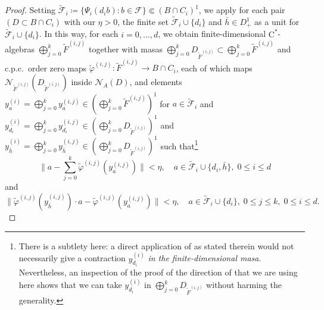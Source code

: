 \documentclass[11pt,a4paper]{amsart}
\theoremstyle{definition}
\numberwithin{equation}{section}
\newcommand{\mc}[1]{\mathcal{#1}}
\begin{document}
\begin{proof}
Setting $\tilde{\mathcal{F}}_i\coloneqq\{\Psi_i(d_ib):b\in \mc{F}\} \Subset (B\cap C_i)^1$, we apply \cite[Proposition~2.3]{LiLiaWin23} for each pair $(D\subset B\cap C_i)$ with our $\eta>0$, the finite set $\tilde{\mc{F}}_i\cup\{d_i\}$  and $\bar{h}\in D_+^1$ as a unit for $\tilde{\mc{F}}_i\cup\{d_i\}$. In this way, for each $i=0,\dots,d$, we obtain finite-dimensional $\mathrm{C}^\ast$-algebras $\bigoplus_{j=0}^k\tilde{F}^{(i,j)}$ together with masas $\bigoplus_{j=0}^kD_{\tilde{F}^{(i,j)}}\subset\bigoplus_{j=0}^k\tilde{F}^{(i,j)}$ and c.p.c.\ order zero maps $\tilde{\varphi}^{(i,j)}\colon\tilde{F}^{(i,j)}\to B\cap C_i$, each of which maps $\mc{N}_{\tilde{F}^{(i,j)}}(D_{\tilde{F}^{(i,j)}})$ inside $\mc{N}_A(D)$, and elements $y_a^{(i)}=\bigoplus_{j=0}^ky_a^{(i,j)}\in(\bigoplus_{j=0}^k\tilde{F}^{(i,j)})^1$ for $a\in\tilde{\mc{F}}_i$ and $y_{d_i}^{(i)} = \bigoplus_{j=0}^ky_{d_i}^{(i,j)}\in (\bigoplus_{j=0}^kD_{\tilde{F}^{(i,j)}})^1$ and $y_{\bar{h}}^{(i)}=\bigoplus_{j=0}^ky_{\bar{h}}^{(i,j)}\in (\bigoplus_{j=0}^kD_{\tilde{F}^{(i,j)}})^1$ such that\footnote{There is a subtlety here: a direct application of \cite[Proposition~2.3]{LiLiaWin23} as stated therein would not necessarily give a contraction $y_{d_i}^{(i)}$ \emph{in the finite-dimensional masa}. Nevertheless, an inspection of the proof of the direction of \cite[Proposition~2.3]{LiLiaWin23} that we are using here shows that we can take $y_{d_i}^{(i)}$ in $\bigoplus_{j=0}^k D_{\tilde{F}^{(i,j)}}$ without harming the generality.}
\begin{equation}\label{eq:mainproof7}
\bigg\|a-\sum_{j=0}^k\tilde{\varphi}^{(i,j)}(y_{a}^{(i,j)})\bigg\|<\eta,\quad a\in\tilde{\mc{F}}_i\cup\{d_i,\bar{h}\},\; 0\le i\le d
\end{equation}
and
\begin{equation}\label{eq:mainproof8}
\|\tilde{\varphi}^{(i,j)}(y_{\bar{h}}^{(i,j)})\cdot a - \tilde{\varphi}^{(i,j)}(y_a^{(i,j)})\|<\eta,\quad a\in\tilde{\mc{F}}_i\cup\{d_i\},\; 0\le j\le k,\; 0\le i\le d.
\end{equation}


\end{proof}
\end{document}
